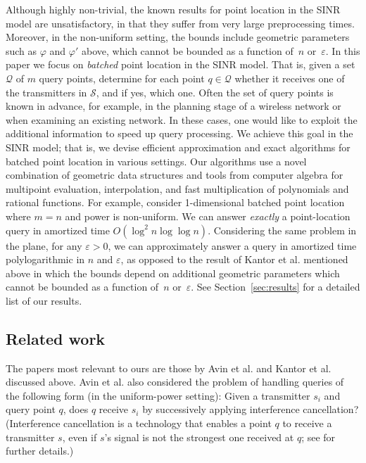 \documentclass[11pt]{article}
\theoremstyle{remark}
\def\Q{\mathcal{Q}}
\def\S{\mathcal{S}}
\let\eps\varepsilon
\begin{document}
Although highly non-trivial, the known results for point location in the SINR model are unsatisfactory, in that they suffer from very large preprocessing times. Moreover, in the non-uniform setting, the bounds include geometric parameters such as $\varphi$ and $\varphi'$ above, which cannot be bounded as a function of~$n$ or~$\eps$.
In this paper we focus on \emph{batched} point location in the SINR  model. 
That is, given a set $\Q$ of $m$ query points, determine for each point $q \in \Q$ whether it receives one of the transmitters in $\S$,
and if yes, which one. Often the set of query points is known in advance, for example, 
in the planning stage of a wireless network or when examining an existing network.  In these cases, one would like to exploit the additional information to speed up query processing.  We achieve this goal in the SINR model; that is, we devise efficient approximation and exact algorithms for batched point location in various settings. Our algorithms use a novel combination of 
geometric data structures and tools from computer algebra for multipoint evaluation, interpolation, and fast multiplication of polynomials and rational functions.
For example, consider 1-dimensional batched point location where $m=n$ and power is non-uniform. We can answer \emph{exactly} a point-location query in amortized time $O(\log^2 n \log \log n)$.  Considering the same problem in the plane, for any $\eps > 0$, we can approximately answer a query in amortized time polylogarithmic in $n$ and $\eps$, as opposed to the result of Kantor et al. \cite{klpp-twn-11} mentioned above in which the bounds depend on additional geometric parameters which cannot be bounded as a function of~$n$ or~$\eps$.  See Section~\ref{sec:results} for a detailed list of our results.

\subsection{Related work}
The papers most relevant to ours are those by Avin et al. \cite{aeklpr-sdciawn-12} and Kantor et al. \cite{klpp-twn-11} discussed above. Avin et al. \cite{SINR-Diag-SIC} also considered the problem of handling queries of the following form (in the uniform-power setting): Given a transmitter $s_i$ and query point $q$, does $q$ receive $s_i$ by successively applying interference cancellation? (Interference cancellation is a technology that enables a point $q$ to receive a transmitter $s$, even if $s$'s signal is not the strongest one received at $q$; see \cite{SINR-Diag-SIC} for further details.) 
\end{document}
